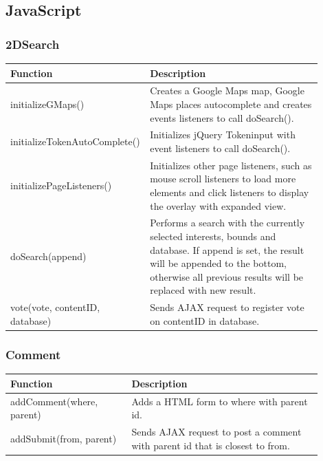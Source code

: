 \subsection{JavaScript}
\label{subsec:CodeDetailsJavaScript}

\subsubsection{2DSearch}
\begin{minipage}{\linewidth}
  \centering
  \setlength{\tabcolsep}{12pt}
  \begin{tabular}{|p{0.35\linewidth}|p{0.55\linewidth}|}
  \hline
  \cellcolor{gray!25} Function & \cellcolor{gray!25} Description \\
  \hline
  initializeGMaps() & Creates a Google Maps map, Google Maps places autocomplete and creates events listeners to call doSearch(). \\
  initializeTokenAutoComplete() & Initializes jQuery Tokeninput with event listeners to call doSearch(). \\
  initializePageListeners() & Initializes other page listeners, such as mouse scroll listeners to load more elements and click listeners to display the overlay with expanded view. \\
  doSearch(append) & Performs a search with the currently selected interests, bounds and database. If append is set, the result will be appended to the bottom, otherwise all previous results will be replaced with new result. \\
  vote(vote, contentID, database) & Sends AJAX request to register vote on contentID in database. \\
  \hline
  \end{tabular}
\end{minipage}

\subsubsection{Comment}
\begin{minipage}{\linewidth}
  \centering
  \setlength{\tabcolsep}{12pt}
  \begin{tabular}{|p{0.35\linewidth}|p{0.55\linewidth}|}
  \hline
  \cellcolor{gray!25} Function & \cellcolor{gray!25} Description \\
  \hline
  addComment(where, parent) & Adds a HTML form to where with parent id. \\
  addSubmit(from, parent) & Sends AJAX request to post a comment with parent id that is closest to from. \\
  \hline
  \end{tabular}
\end{minipage}

